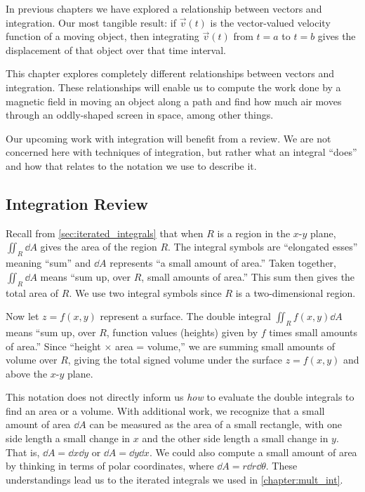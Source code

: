 In previous chapters we have explored a relationship between vectors and integration. Our most tangible result: if $\vec v(t)$ is the vector-valued velocity function of a moving object, then integrating $\vec v(t)$ from $t=a$ to $t=b$ gives the displacement of that object over that time interval.

This chapter explores completely different relationships between vectors and integration. These relationships will enable us to compute the work done by a magnetic field in moving an object along a path and find how much air moves through an oddly-shaped screen in space, among other things. 

Our upcoming work with integration will benefit from a review. We are not concerned here with techniques of integration, but rather what an integral ``does'' and how that relates to the notation we use to describe it.

\subsection{Integration Review}

Recall from \autoref{sec:iterated_integrals} that when $R$ is a region in the $x$-$y$ plane, $ \iint_R\dd A$ gives the area of the region $R$. The integral symbols are ``elongated esses'' meaning ``sum'' and $\dd A$ represents ``a small amount of area.'' Taken together, $\iint_R \dd A$ means ``sum up, over $R$, small amounts of area.'' This sum then gives the total area of $R$. We use two integral symbols since $R$ is a two-dimensional region.

Now let $z=f(x,y)$ represent a surface. The double integral $\iint_R f(x,y)\dd A$ means ``sum up, over $R$, function values (heights) given by $f$ times small amounts of area.'' Since ``height $\times$ area = volume,'' we are summing small amounts of volume over $R$, giving the total signed volume under the surface $z=f(x,y)$ and above the $x$-$y$ plane.

This notation does not directly inform us \emph{how} to evaluate the double integrals to find an area or a volume. With additional work, we recognize that a small amount of area $\dd A$ can be measured as the area of a small rectangle, with one side length a small change in $x$ and the other side length a small change in $y$. That is, $\dd A =\dd x\dd y$ or $\dd A =\dd y\dd x$. We could also compute a small amount of area by thinking in terms of polar coordinates, where $\dd A = r\dd r\dd\theta$. These understandings lead us to the iterated integrals we used in \autoref{chapter:mult_int}.

